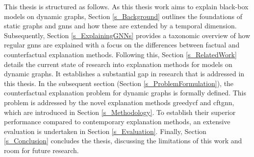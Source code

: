 This thesis is structured as follows. As this thesis work aims to explain black-box models on dynamic graphs, Section \ref{s_Background} outlines the foundations of static graphs and \glspl{gnn} and how these are extended by a temporal dimension. Subsequently, Section \ref{s_ExplainingGNNs} provides a taxonomic overview of how regular \glspl{gnn} are explained with a focus on the differences between factual and counterfactual explanation methods. Following this, Section \ref{s_RelatedWork} details the current state of research into explanation methods for models on dynamic graphs. It establishes a substantial gap in research that is addressed in this thesis. In the subsequent section (Section \ref{s_ProblemFormulation}), the counterfactual explanation problem for dynamic graphs is formally defined. This problem is addressed by the novel explanation methods \gls{greedycf} and \gls{cftgnn}, which are introduced in Section \ref{s_Methodology}. To establish their superior performance compared to contemporary explanation methods, an extensive evaluation is undertaken in Section \ref{s_Evaluation}. Finally, Section \ref{s_Conclusion} concludes the thesis, discussing the limitations of this work and room for future research.

